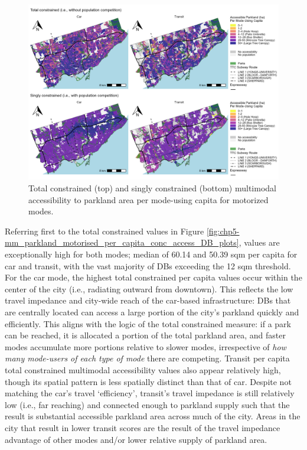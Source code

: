 \documentclass[
11pt, %
oneside, %
english, %
singlespacing, %
]{macthesis} %
\begin{document}
\begin{figure}

{\centering \includegraphics[width=6in]{./data/figures/chp5-mm_parkland_motorised_per_capita_conc_access_DB_plots} 

}

\caption{Total constrained (top) and singly constrained (bottom) multimodal accessibility to parkland area per mode-using capita for motorized modes.\label{fig:chp5-mm_parkland_motorised_per_capita_conc_access_DB_plots}}\label{fig:unnamed-chunk-79}
\end{figure}

Referring first to the total constrained values in Figure \ref{fig:chp5-mm_parkland_motorised_per_capita_conc_access_DB_plots}, values are exceptionally high for both modes; median of 60.14 and 50.39 sqm per capita for car and transit, with the vast majority of DBs exceeding the 12 sqm threshold. For the car mode, the highest total constrained per capita values occur within the center of the city (i.e., radiating outward from downtown). This reflects the low travel impedance and city-wide reach of the car-based infrastructure: DBs that are centrally located can access a large portion of the city's parkland quickly and efficiently. This aligns with the logic of the total constrained measure: if a park can be reached, it is allocated a portion of the total parkland area, and faster modes accumulate more portions relative to slower modes, irrespective of \emph{how many mode-users of each type of mode} there are competing. Transit per capita total constrained multimodal accessibility values also appear relatively high, though its spatial pattern is less spatially distinct than that of car. Despite not matching the car's travel `efficiency', transit's travel impedance is still relatively low (i.e., far reaching) and connected enough to parkland supply such that the result is substantial accessible parkland area across much of the city. Areas in the city that result in lower transit scores are the result of the travel impedance advantage of other modes and/or lower relative supply of parkland area.
\end{document}
